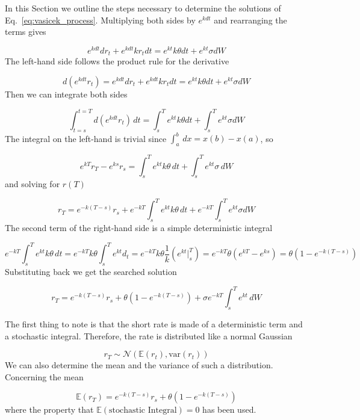 In this Section we outline the steps necessary to determine the solutions 
of Eq.~\ref{eq:vasicek_process}.
Multiplying both sides by \(e^{kdt}\) and rearranging the terms gives

\begin{equation*}
	e^{kdt}dr_t + e^{kdt}kr_t dt = e^{kt}k\theta dt + e^{kt}\sigma dW
\end{equation*}
The left-hand side follows the product rule for the derivative

\begin{equation*}
	d(e^{kdt}r_t) = e^{kdt}dr_t + e^{kdt}kr_t dt= e^{kt}k\theta dt + e^{kt}\sigma dW
\end{equation*}
Then we can integrate both sides

\begin{equation*}
	\int^{t=T}_{t=s} d(e^{kdt}r_t)\,dt = \int^T_s e^{kt}k\theta dt +\int^T_s e^{kt}\sigma dW
\end{equation*}
The integral on the left-hand is trivial since \(\int^b_a\,dx = x(b)-x(a)\), so

\begin{equation*}
	e^{kT}r_T - e^{ks}r_s = \int^T_s e^{kt}k\theta\,dt +\int^T_s e^{kt}\sigma\,dW
\end{equation*}
and solving for \(r(T)\)

\begin{equation*}
	r_T=e^{-k(T-s)}r_s+ e^{-kT}\int^T_s e^{kt}k\theta\,dt +e^{-kT}\int^T_s e^{kt}\sigma dW
\end{equation*}
The second term of the right-hand side is a simple deterministic integral

\[e^{-kT}\int^T_s e^{kt}k\theta\,dt=e^{-kT}k\theta\int^T_s e^{kt}d_t=e^{-kT}k\theta\frac{1}{k}(e^{kt}|^T_s)= e^{-kT}\theta(e^{kT}-e^{ks})=\theta\left(1-e^{-k(T-s)}\right)\]
Substituting back we get the searched solution

\begin{equation}
	r_T=e^{-k(T-s)} r_s+\theta(1-e^{-k(T-s)})+ \sigma e^{-kT}\int^T_s e^{kt}\,dW
\end{equation}

The first thing to note is that the short rate is made of a deterministic term
and a stochastic integral.
Therefore, the rate is distributed like a normal Gaussian

\[r_T \sim \mathcal{N}(\mathbb{E}(r_t), \textrm{var}(r_t))\]
We can also determine the mean and the variance of such a distribution.
Concerning the mean

\begin{equation}
	\mathbb{E}(r_T)=e^{-k(T-s)} r_s+\theta\left(1-e^{-k(T-s)}\right)
\end{equation}
where the property that \(\mathbb{E}(\textrm{stochastic~Integral}) = 0\) has been used.

